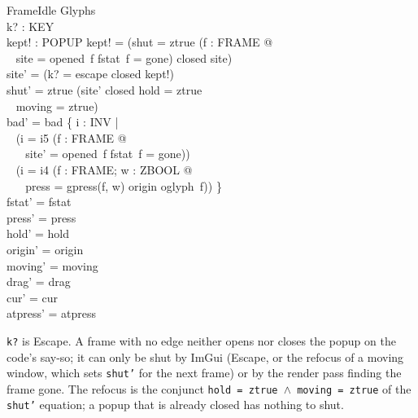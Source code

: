 \documentclass[a4paper,10pt,fleqn]{article}
\begin{document}
\begin{schema}{FrameIdle}
  \Delta Glyphs \\
  k? : KEY \\
  kept! : POPUP
\where
  kept! = (\IF shut = ztrue \lor (\exists f : FRAME @ \\
  \quad~ site = opened~f \land fstat~f = gone) \THEN closed \ELSE site) \\
  site' = (\IF k? = escape \THEN closed \ELSE kept!) \\
  shut' = ztrue \iff (site' \neq closed \land hold = ztrue \\
  \quad~ \land moving = ztrue) \\
  bad' = bad \cup \{ i : INV | \\
  \quad~ (i = i5 \land (\exists f : FRAME @ \\
  \quad~ \quad~ site' = opened~f \land fstat~f = gone)) \\
  \quad~ \lor (i = i4 \land (\exists f : FRAME; w : ZBOOL @ \\
  \quad~ \quad~ press = gpress(f, w) \land origin \neq oglyph~f)) \} \\
  fstat' = fstat \\
  press' = press \\
  hold' = hold \\
  origin' = origin \\
  moving' = moving \\
  drag' = drag \\
  cur' = cur \\
  atpress' = atpress
\end{schema}

\texttt{k?} is Escape.  A frame with no edge neither opens nor closes the popup
on the code's say-so; it can only be shut by ImGui (Escape, or the refocus of a
moving window, which sets \texttt{shut'} for the next frame) or by the render
pass finding the frame gone.  The refocus is the conjunct
\texttt{hold~=~ztrue~$\land$~moving~=~ztrue} of the \texttt{shut'} equation; a
popup that is already closed has nothing to shut.
\end{document}
